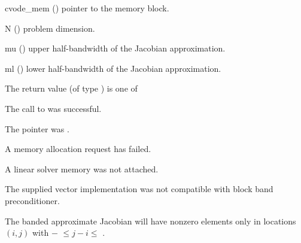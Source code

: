 {
  \begin{args}
  \item[cvode\_mem] ()
    pointer to the {\cvodes} memory block.
  \item[N] ()
    problem dimension.
  \item[mu] ()
    upper half-bandwidth of the Jacobian approximation.
  \item[ml] ()
    lower half-bandwidth of the Jacobian approximation.
  \end{args}
}
{
  The return value  (of type ) is one of
  \begin{args}
  \item[\Id{CVLS\_SUCCESS}]
    The call to  was successful.
  \item[\Id{CVLS\_MEM\_NULL}]
    The  pointer was .
  \item[\Id{CVLS\_MEM\_FAIL}]
    A memory allocation request has failed.
  \item[\Id{CVLS\_LMEM\_NULL}]
    A {\cvls} linear solver memory was not attached.
  \item[\Id{CVLS\_ILL\_INPUT}]
    The supplied vector implementation was not compatible with block
    band preconditioner.
  \end{args}
}
{
  The banded approximate Jacobian will have nonzero elements only in locations
  $(i,j)$ with $-$ $\leq j-i \leq$ .
}

